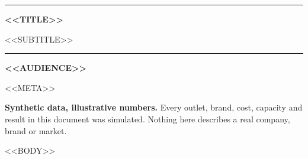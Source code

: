 \documentclass[<<FONTSIZE>>,a4paper]{article}
\renewcommand{\_}{\oldunderscore\penalty500\relax}
\begin{document}
\begin{titlepage}
\vspace*{38mm}
{\color{brand}\rule{\linewidth}{1.2pt}}\par\vspace{6mm}
{\fontsize{24}{29}\selectfont\bfseries <<TITLE>>\par}
\vspace{5mm}
{\large\color{muted} <<SUBTITLE>>\par}
\vspace{6mm}
{\color{brand}\rule{\linewidth}{1.2pt}}\par
\vspace{10mm}
{\normalsize\textbf{<<AUDIENCE>>}\par}
\vspace{4mm}
{\small\color{muted} <<META>>\par}
\vfill
\begin{warnbox}
\textbf{Synthetic data, illustrative numbers.} Every outlet, brand, cost, capacity and result in this
document was simulated. Nothing here describes a real company, brand or market.
\end{warnbox}
\end{titlepage}

\tableofcontents
\clearpage

<<BODY>>
\end{document}
